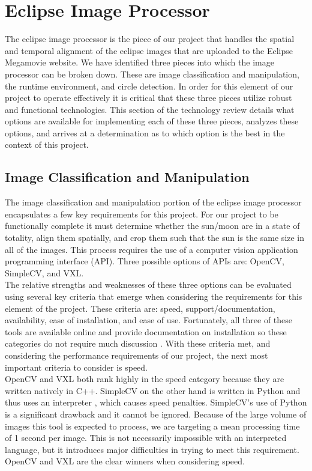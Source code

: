 \documentclass[10pt, onecolumn, draftclsnofoot, letterpaper, compsoc]{IEEEtran}
\begin{document}
\section{Eclipse Image Processor}

The eclipse image processor is the piece of our project that handles the spatial
and temporal alignment of the eclipse images that are uploaded to the Eclipse
Megamovie website. We have identified three pieces into which
the image processor can be broken down. These are image classification and
manipulation, the runtime environment, and circle detection. In order for this
element of our project to operate effectively it is critical that these three
pieces utilize robust and functional technologies. This section of the
technology review details what options are available for implementing each of
these three pieces, analyzes these options, and arrives at a determination as to
which option is the best in the context of this project.\\

\subsection{Image Classification and Manipulation}

The image classification and manipulation portion of the eclipse image processor
encapsulates a few key requirements for this project. For our project to be
functionally complete it must determine whether the sun/moon are in a state of totality, align
them spatially, and crop them such that the sun is the same size in all of the
images. This process requires the use of a computer vision application
programming interface (API). Three possible options of APIs are: OpenCV,
SimpleCV, and VXL. \\

The relative strengths and weaknesses of these three options can be evaluated
using several key criteria that emerge when considering the requirements for
this element of the project. These criteria are: speed, support/documentation,
availability, ease of installation, and ease of use. Fortunately, all three of
these tools are available online and provide documentation on installation so
these categories do not require much discussion \cite{OCV, VXL, SCV}. With these
criteria met, and considering the performance requirements of our project, the
next most important criteria to consider is speed. \\

OpenCV and VXL both rank highly in the speed category because they are written
natively in C++\cite{OCV, VXL}. SimpleCV on the other hand is written in Python
and thus uses an interpreter \cite{SCV}, which causes speed penalties.
SimpleCV's use of Python is a significant drawback and it cannot be ignored.
Because of the large volume of images this tool is expected to process, we are
targeting a mean processing time of 1 second per image. This is not necessarily
impossible with an interpreted language, but it introduces major difficulties in
trying to meet this requirement. OpenCV and VXL are the clear winners when
considering speed. \\
\end{document}
